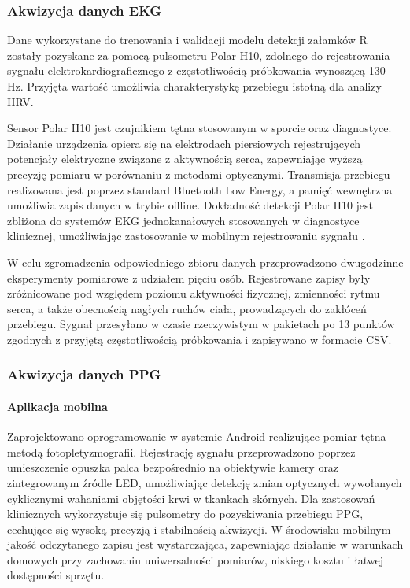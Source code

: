 \documentclass[journal]{IEEEtran}
\begin{document}
{\subsubsection{Akwizycja danych EKG}
Dane wykorzystane do trenowania i walidacji modelu detekcji załamków R zostały pozyskane za pomocą pulsometru Polar H10, zdolnego do rejestrowania sygnału elektrokardiograficznego z częstotliwością próbkowania wynoszącą 130 Hz. Przyjęta wartość umożliwia charakterystykę przebiegu istotną dla analizy HRV.

Sensor Polar H10 jest czujnikiem tętna stosowanym w sporcie oraz diagnostyce. Działanie urządzenia opiera się na elektrodach piersiowych rejestrujących potencjały elektryczne związane z aktywnością serca, zapewniając wyższą precyzję pomiaru w porównaniu z metodami optycznymi. Transmisja przebiegu realizowana jest poprzez standard Bluetooth Low Energy, a pamięć wewnętrzna umożliwia zapis danych w trybie offline. Dokładność detekcji Polar H10 jest zbliżona do systemów EKG jednokanałowych stosowanych w diagnostyce klinicznej, umożliwiając zastosowanie w mobilnym rejestrowaniu sygnału \cite{21}.

W celu zgromadzenia odpowiedniego zbioru danych przeprowadzono dwugodzinne eksperymenty pomiarowe z udziałem pięciu osób. Rejestrowane zapisy były zróżnicowane pod względem poziomu aktywności fizycznej, zmienności rytmu serca, a także obecnością nagłych ruchów ciała, prowadzących do zakłóceń przebiegu. Sygnał przesyłano w czasie rzeczywistym w pakietach po 13 punktów zgodnych z przyjętą częstotliwością próbkowania i zapisywano w formacie CSV. 


\subsubsection{Akwizycja danych PPG}
\paragraph{Aplikacja mobilna}
Zaprojektowano oprogramowanie w systemie Android realizujące pomiar tętna metodą fotopletyzmografii. Rejestrację sygnału przeprowadzono poprzez umieszczenie opuszka palca bezpośrednio na obiektywie kamery oraz zintegrowanym źródle LED, umożliwiając detekcję zmian optycznych wywołanych cyklicznymi wahaniami objętości krwi w tkankach skórnych. 
\newpage
Dla zastosowań klinicznych wykorzystuje się pulsometry do pozyskiwania przebiegu PPG, cechujące się wysoką precyzją i stabilnością akwizycji. W środowisku mobilnym jakość odczytanego zapisu jest wystarczająca, zapewniając działanie w warunkach domowych przy zachowaniu uniwersalności pomiarów, niskiego kosztu i łatwej dostępności sprzętu.


}
\end{document}
